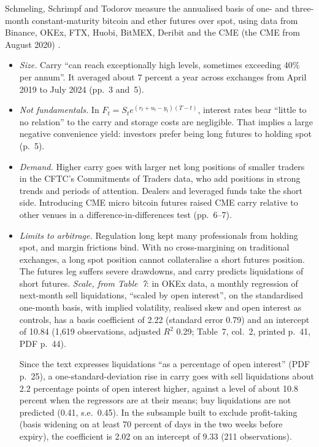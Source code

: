 \begin{qfevidence}\label{ev:crypto-dated-futures-carry}
 Schmeling, Schrimpf and Todorov measure the annualised basis of one- and three-month constant-maturity bitcoin and ether futures over spot, using data from Binance, OKEx, FTX, Huobi, BitMEX, Deribit and the CME (the CME from August 2020) \citep[revision of 1 October 2025, abstract, sec.~1 and data section, PDF pp.~3--9]{roadmap-carry}.
\begin{itemize}
\item \emph{Size.} Carry ``can reach exceptionally high levels, sometimes exceeding 40\% per annum''. It averaged about 7 percent a year across exchanges from April 2019 to July 2024 (pp.~3 and~5).
\item \emph{Not fundamentals.} In $F_t=S_te^{(r_t+u_t-y_t)(T-t)}$, interest rates bear ``little to no relation'' to the carry and storage costs are negligible. That implies a large negative convenience yield: investors prefer being long futures to holding spot (p.~5).
\item \emph{Demand.} Higher carry goes with larger net long positions of smaller traders in the CFTC's Commitments of Traders data, who add positions in strong trends and periods of attention. Dealers and leveraged funds take the short side. Introducing CME micro bitcoin futures raised CME carry relative to other venues in a difference-in-differences test (pp.~6--7).
\item \emph{Limits to arbitrage.} Regulation long kept many professionals from holding spot, and margin frictions bind. With no cross-margining on traditional exchanges, a long spot position cannot collateralise a short futures position. The futures leg suffers severe drawdowns, and carry predicts liquidations of short futures. \emph{Scale, from Table~7}: in OKEx data, a monthly regression of next-month sell liquidations, ``scaled by open interest'', on the standardised one-month basis, with implied volatility, realised skew and open interest as controls, has a basis coefficient of 2.22 (standard error 0.79) and an intercept of 10.84 (1,619 observations, adjusted $R^2$ 0.29; Table~7, col.~2, printed p.~41, PDF p.~44).

Since the text expresses liquidations ``as a percentage of open interest'' (PDF p.~25), a one-standard-deviation rise in carry goes with sell liquidations about 2.2 percentage points of open interest higher, against a level of about 10.8 percent when the regressors are at their means; buy liquidations are not predicted (0.41, s.e.\ 0.45). In the subsample built to exclude profit-taking (basis widening on at least 70 percent of days in the two weeks before expiry), the coefficient is 2.02 on an intercept of 9.33 (211 observations).


\end{itemize}
\end{qfevidence}
